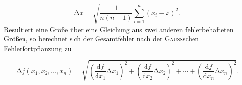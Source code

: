 \documentclass[
  bibliography=totoc,     %
  captions=tableheading,  %
  titlepage=firstiscover, %
]{scrartcl}
\begin{document}
\begin{equation}
    \mathup{\Delta}\bar{x}=\sqrt{\frac{1}{n(n-1)}\sum_{i=1}^n\left(x_i-\bar{x}\right)^2}.
\end{equation}
Resultiert eine Größe über eine Gleichung aus zwei anderen fehlerbehafteten Größen, so
berechnet sich der Gesamtfehler nach der \textsc{Gauß}schen Fehlerfortpflanzung zu

\begin{equation}
    \mathup{\Delta}f(x_1,x_2,...,x_n)=\sqrt{\left(\frac{\mathup{d}f}{\mathup{d}x_1}\mathup{\Delta}x_1\right)^2+\left(\frac{\mathup{d}f}{\mathup{d}x_2}\mathup{\Delta}x_2\right)^2+ \dotsb +\left(\frac{\mathup{d}f}{\mathup{d}x_n}\mathup{\Delta}x_n\right)^2}.
\end{equation}
\end{document}
